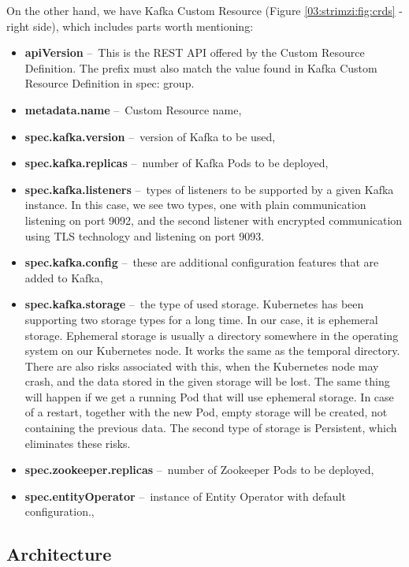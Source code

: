 On the other hand, we have Kafka Custom Resource (Figure \ref{03:strimzi:fig:crds} - right side), which includes parts worth mentioning:
\begin{itemize}[itemsep=1mm, parsep=0pt]
  \item \textbf{apiVersion} \---\ This is the REST API offered by the Custom Resource Definition. The prefix must also match the value found in Kafka Custom Resource Definition in spec: group. 
  \item \textbf{metadata.name} \---\ Custom Resource name,
  \item \textbf{spec.kafka.version} \---\ version of Kafka to be used,
  \item \textbf{spec.kafka.replicas} \---\ number of Kafka Pods to be deployed,
  \item \textbf{spec.kafka.listeners} \---\ types of listeners to be supported by a given Kafka instance. In this case, we see two types, one with plain communication listening on port 9092, and the second listener with encrypted communication using TLS technology and listening on port 9093.
  \item  \textbf{spec.kafka.config} \---\ these are additional configuration features that are added to Kafka,
  \item  \textbf{spec.kafka.storage} \cite{strimziStorageBlogPost} \---\ the type of used storage. Kubernetes has been supporting two storage types for a long time. In our case, it is ephemeral storage. Ephemeral storage is usually a directory somewhere in the operating system on our Kubernetes node. It works the same as the temporal directory. There are also risks associated with this, when the Kubernetes node may crash, and the data stored in the given storage will be lost. The same thing will happen if we get a running Pod that will use ephemeral storage. In case of a restart, together with the new Pod, empty storage will be created, not containing the previous data. The second type of storage is Persistent, which eliminates these risks.
  \item \textbf{spec.zookeeper.replicas} \---\ number of Zookeeper Pods to be deployed,
  \item \textbf{spec.entityOperator} \---\ instance of Entity Operator with default configuration.,
\end{itemize}

\subsection{Architecture}


